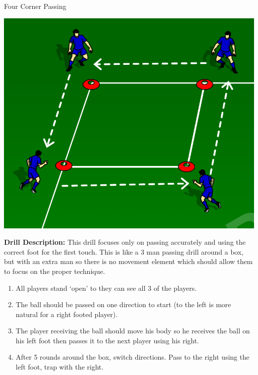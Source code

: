 \begin{evenBlock}{Four Corner Passing}

\begin{minipage}[t]{\linewidth}
    \centering
    
    \begin{minipage}{.3\linewidth} %
        \includegraphics[width=.8\textwidth]{../img/Trimmed/Triangle_Passing_4P_mini}
    \end{minipage}
    \hspace{0.05\linewidth}
    \begin{minipage}{.6\linewidth} %
        \textbf{Drill Description:}
        This drill focuses only on passing accurately and using the correct foot for the first touch.  This is like a 3 man passing drill around a box, but with an extra man so there is no movement element which should allow them to focus on the proper technique.
        \begin{enumerate}
            \setlength{\itemsep}{0pt}
            \setlength{\parskip}{0pt}
            \setlength{\parsep}{0pt}
            \item All players stand `open' to they can see all 3 of the players.
            \item The ball should be passed on one direction to start (to the left is more natural for a right footed player).
            \item The player receiving the ball should move his body so he receives the ball on his left foot then passes it to the next player using his right.
            \item After 5 rounds around the box, switch directions.  Pass to the right using the left foot, trap with the right.
        \end{enumerate}
    \end{minipage}


\end{minipage}
\end{evenBlock}
